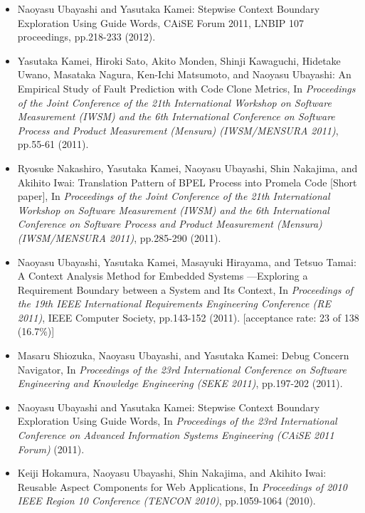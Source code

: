\documentclass{jarticle}
\begin{document}
\begin{itemize}
\item Naoyasu Ubayashi and Yasutaka Kamei:
Stepwise Context Boundary Exploration Using Guide Words,
CAiSE Forum 2011, LNBIP 107 proceedings,
pp.218-233 (2012).

\item Yasutaka Kamei, Hiroki Sato, Akito Monden, Shinji Kawaguchi, Hidetake Uwano, Masataka Nagura, Ken-Ichi Matsumoto, and Naoyasu Ubayashi:
An Empirical Study of Fault Prediction with Code Clone Metrics,
In {\em Proceedings of the Joint Conference of the 21th International Workshop on Software Measurement (IWSM) and the 6th International Conference on Software Process and Product Measurement (Mensura) (IWSM/MENSURA 2011)},
pp.55-61 (2011).

\item Ryosuke Nakashiro, Yasutaka Kamei, Naoyasu Ubayashi, Shin Nakajima, and Akihito Iwai:
Translation Pattern of BPEL Process into Promela Code [Short paper],
In {\em Proceedings of the Joint Conference of the 21th International Workshop on Software Measurement (IWSM) and the 6th International Conference on Software Process and Product Measurement (Mensura) (IWSM/MENSURA 2011)},
pp.285-290 (2011).

\item Naoyasu Ubayashi, Yasutaka Kamei, Masayuki Hirayama, and Tetsuo Tamai:
A Context Analysis Method for Embedded Systems ---Exploring a Requirement Boundary between a System and Its Context,
In {\em Proceedings of the 19th IEEE International Requirements Engineering Conference (RE 2011)},
IEEE Computer Society, pp.143-152 (2011).
[acceptance rate: 23 of 138 (16.7\%)]

\item Masaru Shiozuka, Naoyasu Ubayashi, and Yasutaka Kamei:
Debug Concern Navigator,
In {\em Proceedings of the 23rd International Conference on Software Engineering and Knowledge Engineering (SEKE 2011)},
pp.197-202 (2011).

\item Naoyasu Ubayashi and Yasutaka Kamei:
Stepwise Context Boundary Exploration Using Guide Words,
In {\em Proceedings of the 23rd International Conference on Advanced Information Systems Engineering (CAiSE 2011 Forum)} (2011).

\item Keiji Hokamura, Naoyasu Ubayashi, Shin Nakajima, and Akihito Iwai:
Reusable Aspect Components for Web Applications,
In {\em Proceedings of 2010 IEEE Region 10 Conference (TENCON 2010)},
pp.1059-1064 (2010).


\end{itemize}
\end{document}
